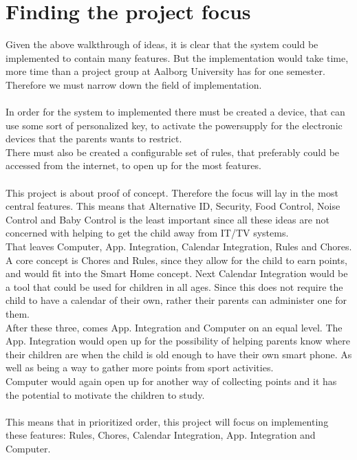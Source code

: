 \section{Finding the project focus}
Given the above walkthrough of ideas, it is clear that the system could be implemented to contain many features. But the implementation would take time, more time than a project group at Aalborg University has for one semester. Therefore we must narrow down the field of implementation.\\
\\
In order for the system to implemented there must be created a device, that can use some sort of personalized key, to activate the powersupply for the electronic devices that the parents wants to restrict.\\
There must also be created a configurable set of rules, that preferably could be accessed from the internet, to open up for the most features.\\
\\
This project is about proof of concept. Therefore the focus will lay in the most central features. This means that Alternative ID, Security, Food Control, Noise Control and Baby Control is the least important since all these ideas are not concerned with helping to get the child away from IT/TV systems.\\
That leaves Computer, App. Integration, Calendar Integration, Rules and Chores.\\
A core concept is Chores and Rules, since they allow for the child to earn points, and would fit into the Smart Home concept.
Next Calendar Integration would be a tool that could be used for children in all ages. Since this does not require the child to have a calendar of their own, rather their parents can administer one for them.\\
After these three, comes App. Integration and Computer on an equal level. The App. Integration would open up for the possibility of helping parents know where their children are when the child is old enough to have their own smart phone. As well as being a way to gather more points from sport activities.\\
Computer would again open up for another way of collecting points and it has the potential to motivate the children to study.\\
\\
This means that in prioritized order, this project will focus on implementing these features: Rules, Chores, Calendar Integration, App. Integration and Computer.